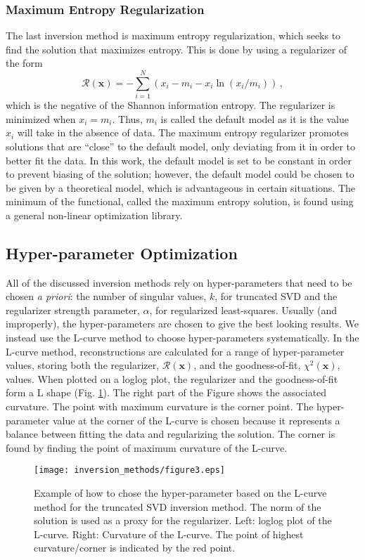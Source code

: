 \subsubsection{Maximum Entropy Regularization}
The last inversion method is maximum entropy regularization, which seeks to find the solution that maximizes entropy. This is done by using a regularizer of the form 
\begin{equation}
	\mathcal{R}(\mathbf{x}) = -\sum_{i=1}^N (x_i-m_i-x_i\ln(x_i/m_i)) \, ,
\end{equation}
which is the negative of the Shannon information entropy. 
The regularizer is minimized when $x_i = m_i$. Thus, $m_i$ is called the default model as it is the value $x_i$ will take in the absence of data. The maximum entropy regularizer promotes solutions that are ``close'' to the default model, only deviating from it in order to better fit the data. In this work, the default model is set to be constant in order to prevent biasing of the solution; however, the default model could be chosen to be given by a theoretical model, which is advantageous in certain situations. 
The minimum of the functional, called the maximum entropy solution, is found using a general non-linear optimization library\cite{giffin2007updating,wachter2006ipopt,LubinDunningIJOC}.

\subsection{Hyper-parameter Optimization}
All of the discussed inversion methods rely on hyper-parameters that need to be chosen \textit{a priori}: the number of singular values, $k$, for truncated SVD and the regularizer strength parameter, $\alpha$, for regularized  least-squares. Usually (and improperly), the hyper-parameters are chosen to give the best looking results. We instead use the L-curve method\cite{Hansen2007} to choose hyper-parameters systematically. 
In the L-curve method, reconstructions are calculated for a range of hyper-parameter values, storing both the regularizer, $\mathcal{R}(\mathbf{x})$, and the goodness-of-fit, $\chi^2(\mathbf{x})$, values. When plotted on a loglog plot, the regularizer and the goodness-of-fit form a L shape (Fig. \ref{fig:L_curve}). The right part of the Figure shows the associated curvature. The point with maximum curvature is the corner point. The hyper-parameter value at the corner of the L-curve is chosen because it represents a balance between fitting the data and regularizing the solution. The corner is found by finding the point of maximum curvature of the L-curve.
\begin{figure}[h!]
    \centering
    \texttt{[image: inversion\_methods/figure3.eps]}
    \caption{Example of how to chose the hyper-parameter based on the L-curve method for the truncated SVD inversion method. The norm of the solution is used as a proxy for the regularizer. Left: loglog plot of the L-curve. Right: Curvature of the L-curve. The point of highest curvature/corner is indicated by the red point.}
    \label{fig:L_curve}
\end{figure}

